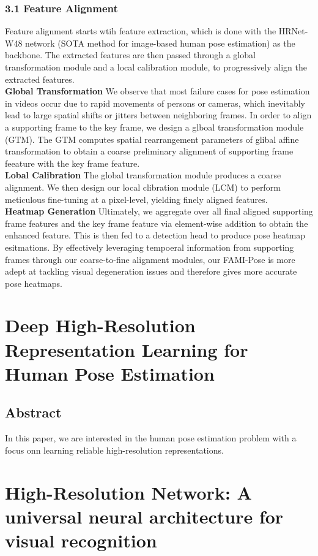 \documentclass[a4paper]{report}
\begin{document}
\subsection*{3.1 Feature Alignment}
Feature alignment starts wtih feature extraction, which is done with the HRNet-W48 network (SOTA method for image-based human pose estimation) as the backbone. The extracted features are then passed through a global transformation module and a local calibration module, to progressively align the extracted features.
\\
\textbf{Global Transformation} We observe that most failure cases for pose estimation in videos occur due to rapid movements of persons or cameras, which inevitably lead to large spatial shifts or jitters between neighboring frames. In order to align a supporting frame to the key frame, we design a glboal transformation module (GTM). The GTM computes spatial rearrangement parameters of glibal affine transformation to obtain a coarse preliminary alignment of supporting frame feeature with the key frame feature.
\\
\textbf{Lobal Calibration} The global transformation module produces a coarse alignment. We then design our local clibration module (LCM) to perform meticulous fine-tuning at a pixel-level, yielding finely aligned features.
\\
\textbf{Heatmap Generation} Ultimately, we aggregate over all final aligned supporting frame features and the key frame feature via element-wise addition to obtain the enhanced feature. This is then fed to a detection head to produce pose heatmap esitmations. By effectively leveraging tempoeral information from supporting frames through our coarse-to-fine alignment modules, our FAMI-Pose is more adept at tackling visual degeneration issues and therefore gives more accurate pose heatmaps.

\chapter*{Deep High-Resolution Representation Learning for Human Pose Estimation}
\section*{Abstract}
In this paper, we are interested in the human pose estimation problem with a focus onn learning reliable high-resolution representations.

\chapter*{High-Resolution Network: A universal neural architecture for visual recognition}
\end{document}
